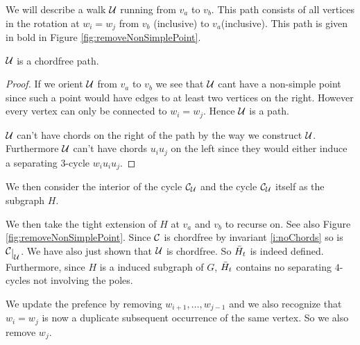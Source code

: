   We will describe a walk $\mathcal{U}$ running from $v_a$ to $v_b$. This path consists of all vertices in the rotation at $w_i=w_j$ from $v_b$ (inclusive) to $v_a$(inclusive). This path is given in bold in Figure \ref{fig:removeNonSimplePoint}.

  \begin{lemma}
  $\mathcal{U}$ is a chordfree path.
  \end{lemma}
  \begin{proof}
    If we orient $\mathcal{U}$ from $v_a$ to $v_b$  we see that $\mathcal{U}$ cant have a non-simple point since such a point would have edges to at least two vertices on the right. However every vertex can only be connected to $w_i=w_j$. Hence $\mathcal{U}$ is a path.

    $\mathcal{U}$ can't have chords on the right of the path by the way we construct $\mathcal{U}$. Furthermore $\mathcal{U}$ can't have chords $u_i u_j$ on the left since they would either induce a separating $3$-cycle $w_i u_i u_j$.
  \end{proof}


  We then consider the interior of the cycle $\mathcal{C}_{\mathcal{U}}$ and the cycle $\mathcal{C}_{\mathcal{U}}$ itself as the subgraph $H$.

  We then take the tight extension of $H$ at $v_a$ and $v_b$ to recurse on. See also Figure \ref{fig:removeNonSimplePoint}. Since $\mathcal{C}$ is chordfree by invariant \ref{i:noChords} so is $\restC{\U}$. We have also just shown that $\mathcal{U}$ is chordfree. So $\bar{H}_t$ is indeed defined. Furthermore, since $H$ is a induced subgraph of $G$, $\bar{H}_t$ contains no separating $4$-cycles not involving the poles.

   We update the prefence by removing $w_{i+1}, \ldots, w_{j-1}$ and we also recognize that $w_i = w_j$ is now a duplicate subsequent occurrence of the same vertex. So we also remove $w_j$.

